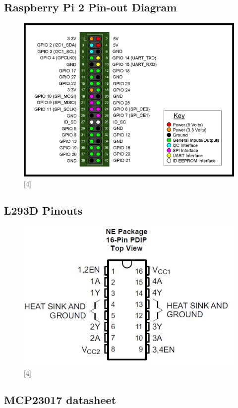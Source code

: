 \documentclass[11pt,a4paper]{article}
\begin{document}
	\subsection{Raspberry Pi 2 Pin-out Diagram}
	\begin{figure}[h!]
		\includegraphics[scale=0.6]{RaspberryPi2_pinout.jpg}
		\centering
		\caption{[4]}
	\end{figure}
	\subsection{L293D Pinouts}
	\begin{figure}[h!]
		\includegraphics[scale=0.6]{l293d.jpg}
		\centering
		\caption{[4]}
	\end{figure}
	
	\subsection{MCP23017 datasheet}
	
\end{document}
